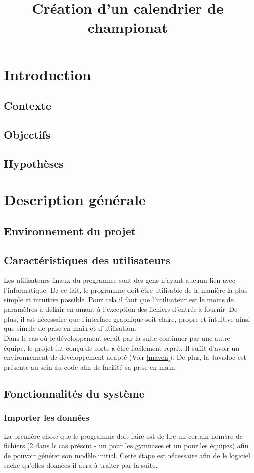 \documentclass[final, noposter]{polytech/polytech}
\title{Création d'un calendrier de championat}
\begin{document}
\chapter{Introduction}
	\section{Contexte}
	\section{Objectifs}
	\section{Hypothèses}

\chapter{Description générale}	
	\section{Environnement du projet}
	\section{Caractéristiques des utilisateurs}
		Les utilisateurs finaux du programme sont des gens n'ayant aucuun lien avec l'informatique. De ce fait, le programme doit être utilisable de la manière la plus simple et intuitive possible. Pour cela il faut que l'utilisateur est le moins de paramètres à définir en amont à l'exception des fichiers d'entrée à fournir. De plus, il est nécessaire que l'interface graphique soit claire, propre et intuitive ainsi que simple de prise en main et d'utilisation. \\
 		
		Dans le cas où le développement serait par la suite continuer par une autre équipe, le projet fut conçu de sorte à être facilement reprit. Il suffit d'avoir un environnement de développement adapté (Voir \autoref{maven}). De plus, la Javadoc est présente au sein du code afin de facilité sa prise en main.

	\section{Fonctionnalités du système}
		\subsection{Importer les données}
			La première chose que le programme doit faire est de lire un certain nombre de fichiers (2 dans le cas présent - un pour les gymnases et un pour les équipes) afin de pouvoir générer son modèle initial. Cette étape est nécessaire afin de le logiciel sache qu'elles données il aura à traiter par la suite. \\
\end{document}
